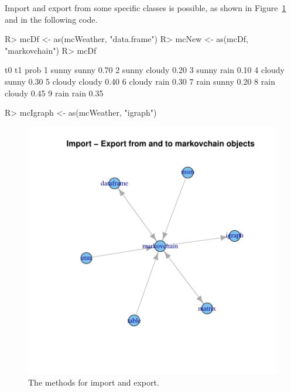 \documentclass[nojss]{jss}
\begin{document}
Import and export from some specific classes is possible, as shown in
Figure~\ref{fig:fromAndTo} and in the following code.\\

\begin{Schunk}
\begin{Sinput}
R> mcDf <- as(mcWeather, "data.frame")
R> mcNew <- as(mcDf, "markovchain")
R> mcDf
\end{Sinput}
\begin{Soutput}
      t0     t1 prob
1  sunny  sunny 0.70
2  sunny cloudy 0.20
3  sunny   rain 0.10
4 cloudy  sunny 0.30
5 cloudy cloudy 0.40
6 cloudy   rain 0.30
7   rain  sunny 0.20
8   rain cloudy 0.45
9   rain   rain 0.35
\end{Soutput}
\begin{Sinput}
R> mcIgraph <- as(mcWeather, "igraph")
\end{Sinput}
\end{Schunk}

\begin{figure}
\begin{center}
\includegraphics{an_introduction_to_markovchain_package-importExportPlot}
\caption{The  methods for import and export.}
\label{fig:fromAndTo}
\end{center}
\end{figure}
\end{document}

